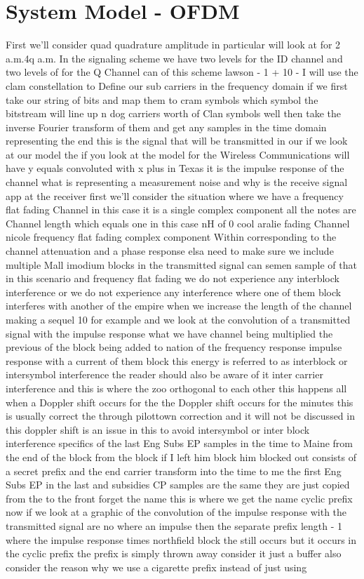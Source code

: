 \documentclass[]{book}
\begin{document}
\section{System Model - OFDM}
First we'll consider quad quadrature amplitude in particular will look at for 2 a.m.4q a.m. In the signaling scheme we have two levels for the ID channel and two levels of for the Q Channel can of this scheme lawson - 1 + 10 - I will use the clam constellation to Define our sub carriers in the frequency domain if we first take our string of bits and map them to cram symbols which symbol the bitstream will line up n dog carriers worth of Clan symbols well then take the inverse Fourier transform of them and get any samples in the time domain representing the end this is the signal that will be transmitted in our if we look at our model the if you look at the model for the Wireless Communications will have y equals convoluted with x plus in Texas it is the impulse response of the channel what is representing a measurement noise and why is the receive signal app at the receiver first we'll consider the situation where we have a frequency flat fading Channel in this case it is a single complex component all the notes are Channel length which equals one in this case nH of 0 cool aralie fading Channel nicole frequency flat fading complex component Within corresponding to the channel attenuation and a phase response elsa need to make sure we include multiple Mall imodium blocks in the transmitted signal can semen sample of that in this scenario and frequency flat fading we do not experience any interblock interference or we do not experience any interference where one of them block interferes with another of the empire when we increase the length of the channel making a sequel 10 for example and we look at the convolution of a transmitted signal with the impulse response what we have channel being multiplied the previous of the block being added to nation of the frequency response impulse response with a current of them block this energy is referred to as interblock or intersymbol interference the reader should also be aware of it inter carrier interference and this is where the zoo orthogonal to each other this happens all when a Doppler shift occurs for the the Doppler shift occurs for the minutes this is usually correct the through pilottown correction and it will not be discussed in this doppler shift is an issue in this to avoid intersymbol or inter block interference specifics of the last Eng Subs EP samples in the time to Maine from the end of the block from the block if I left him block him blocked out consists of a secret prefix and the end carrier transform into the time to me the first Eng Subs EP in the last and subsidies CP samples are the same they are just copied from the to the front forget the name this is where we get the name cyclic prefix now if we look at a graphic of the convolution of the impulse response with the transmitted signal are no where an impulse then the separate prefix length - 1 where the impulse response times northfield block the still occurs but it occurs in the cyclic prefix the prefix is simply thrown away consider it just a buffer also consider the reason why we use a cigarette prefix instead of just using 
\end{document}
